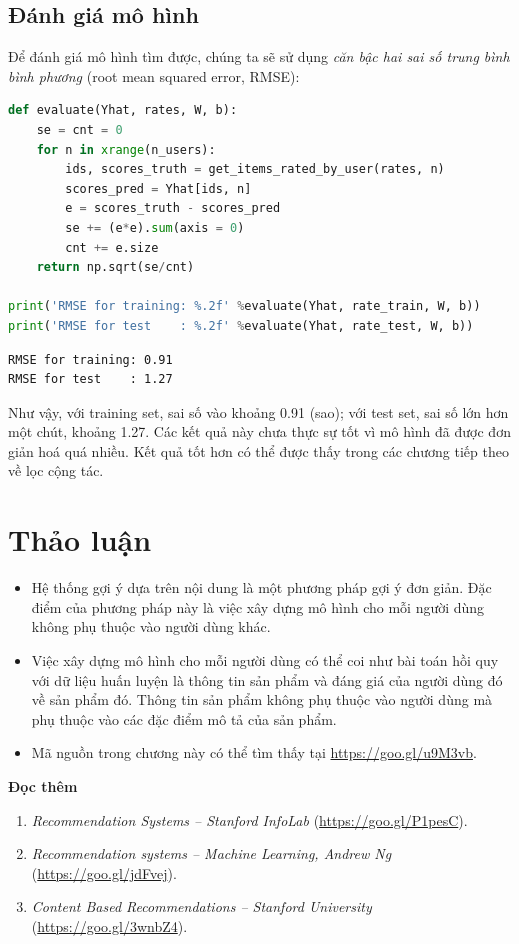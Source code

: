 \subsection{Đánh giá mô hình}
Để đánh giá mô hình tìm được, chúng ta sẽ sử dụng \textit{căn bậc hai sai số trung bình bình phương} (root mean squared error, RMSE):
\begin{lstlisting}[language=Python]
def evaluate(Yhat, rates, W, b):
    se = cnt = 0
    for n in xrange(n_users):
        ids, scores_truth = get_items_rated_by_user(rates, n)
        scores_pred = Yhat[ids, n]
        e = scores_truth - scores_pred 
        se += (e*e).sum(axis = 0)
        cnt += e.size 
    return np.sqrt(se/cnt)

print('RMSE for training: %.2f' %evaluate(Yhat, rate_train, W, b))
print('RMSE for test    : %.2f' %evaluate(Yhat, rate_test, W, b))
\end{lstlisting}
\kq 
\begin{lstlisting}
RMSE for training: 0.91
RMSE for test    : 1.27
\end{lstlisting}
 
 
Như vậy, với training set, sai số vào khoảng 0.91 (sao); với test set, sai số
lớn hơn một chút, khoảng 1.27. Các kết quả này chưa thực sự tốt
vì mô hình đã được đơn giản hoá quá nhiều. Kết quả tốt hơn có thể được thấy
trong các chương tiếp theo về lọc cộng tác. 
 
 
\section{Thảo luận}

\begin{itemize}
    \item Hệ thống gợi ý dựa trên nội dung là một phương pháp gợi ý đơn giản. Đặc điểm của phương pháp này là việc xây dựng mô hình cho mỗi người dùng không phụ thuộc vào người dùng khác.  
     
    \item Việc xây dựng mô hình cho mỗi người dùng có thể coi như bài
    toán hồi quy với dữ liệu huấn luyện là thông tin sản phẩm và đáng giá của người dùng đó về sản phẩm đó. Thông tin sản phẩm không phụ thuộc vào người dùng mà phụ thuộc vào các đặc điểm mô tả của sản phẩm.
     
    \item Mã nguồn trong chương này có thể tìm thấy tại
    \url{https://goo.gl/u9M3vb}.
\end{itemize}
 
 
 
\textbf{Đọc thêm}
\begin{enumerate}
    \item \textit{Recommendation Systems -- Stanford InfoLab}
    (\url{https://goo.gl/P1pesC}).

    \item \textit{Recommendation systems -- Machine Learning, Andrew Ng}
    (\url{https://goo.gl/jdFvej}).


    \item \textit{Content Based Recommendations -- Stanford University}
    (\url{https://goo.gl/3wnbZ4}).
\end{enumerate}
